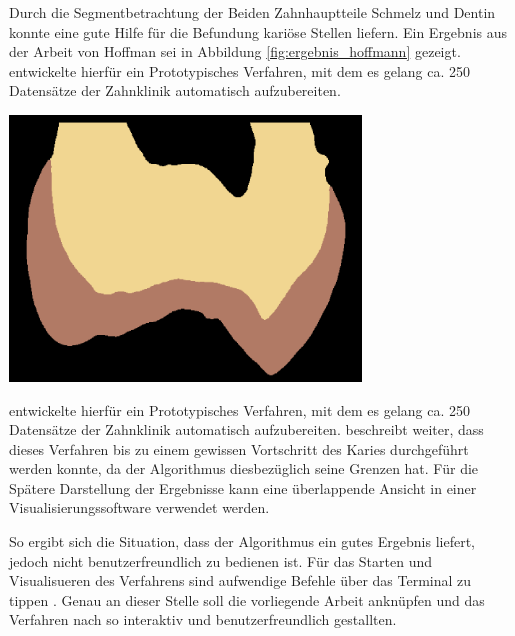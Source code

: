 \begin{minipage}{0.30\textwidth}
	Durch die Segmentbetrachtung der Beiden Zahnhauptteile Schmelz und Dentin konnte
	\citet{hoffmann2020} eine gute Hilfe für die Befundung kariöse Stellen liefern.
	Ein Ergebnis aus der Arbeit von Hoffman sei in Abbildung \ref{fig:ergebnis_hoffmann}
	gezeigt. \citet{hoffmann2020} entwickelte hierfür ein Prototypisches Verfahren,
	mit dem es gelang ca. 250 Datensätze der Zahnklinik automatisch aufzubereiten.
\end{minipage}
\hfill
\begin{minipage}{0.60\textwidth}
	\centering
	\includegraphics[width=0.7\textwidth]{img/ergebnis_hoffmann_2.jpg}
	\label{fig:ergebnis_hoffmann}
\end{minipage}

\citet{hoffmann2020} entwickelte hierfür ein Prototypisches Verfahren, mit dem
es gelang ca. 250 Datensätze der Zahnklinik automatisch aufzubereiten. \citet{hoffmann2020}
beschreibt weiter, dass dieses Verfahren bis zu einem gewissen Vortschritt des
Karies durchgeführt werden konnte, da der Algorithmus diesbezüglich seine Grenzen
hat. Für die Spätere Darstellung der Ergebnisse kann eine überlappende Ansicht
in einer Visualisierungssoftware verwendet werden.

So ergibt sich die Situation, dass der Algorithmus ein gutes Ergebnis liefert,
jedoch nicht benutzerfreundlich zu bedienen ist. Für das Starten und Visualisueren
des Verfahrens sind aufwendige Befehle über das Terminal zu tippen \citep[vgl.][Seite
53]{hoffmann2020}. Genau an dieser Stelle soll die vorliegende Arbeit anknüpfen
und das Verfahren nach \citet{hoffmann2020} so interaktiv und benutzerfreundlich
gestallten.

